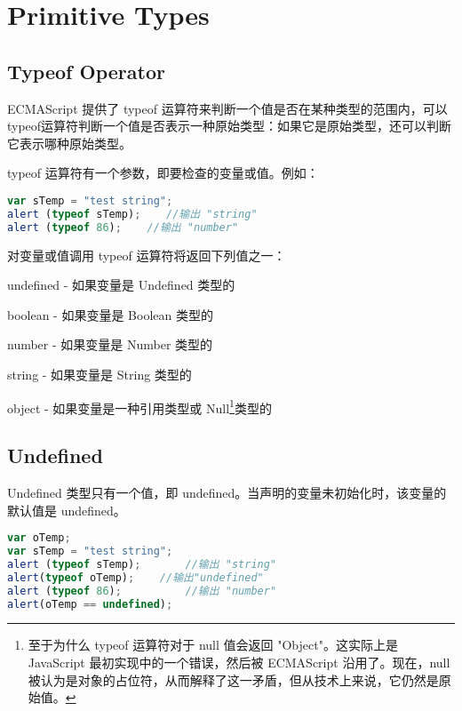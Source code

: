 \chapter{Primitive Types}




\section{Typeof Operator}


ECMAScript 提供了 typeof 运算符来判断一个值是否在某种类型的范围内，可以typeof运算符判断一个值是否表示一种原始类型：如果它是原始类型，还可以判断它表示哪种原始类型。

typeof 运算符有一个参数，即要检查的变量或值。例如：



\begin{lstlisting}[language=JavaScript]
var sTemp = "test string";
alert (typeof sTemp);    //输出 "string"
alert (typeof 86);    //输出 "number"
\end{lstlisting}



对变量或值调用 typeof 运算符将返回下列值之一：

\begin{compactitem}
\item undefined - 如果变量是 Undefined 类型的
\item boolean - 如果变量是 Boolean 类型的
\item number - 如果变量是 Number 类型的
\item string - 如果变量是 String 类型的
\item object - 如果变量是一种引用类型或 Null\footnote{至于为什么 typeof 运算符对于 null 值会返回 "Object"。这实际上是 JavaScript 最初实现中的一个错误，然后被 ECMAScript 沿用了。现在，null 被认为是对象的占位符，从而解释了这一矛盾，但从技术上来说，它仍然是原始值。}类型的
\end{compactitem}





\section{Undefined}


Undefined 类型只有一个值，即 undefined。当声明的变量未初始化时，该变量的默认值是 undefined。



\begin{lstlisting}[language=JavaScript]
var oTemp;
var sTemp = "test string";
alert (typeof sTemp);    	//输出 "string"
alert(typeof oTemp);	//输出"undefined"
alert (typeof 86);    		//输出 "number"
alert(oTemp == undefined);
\end{lstlisting}

